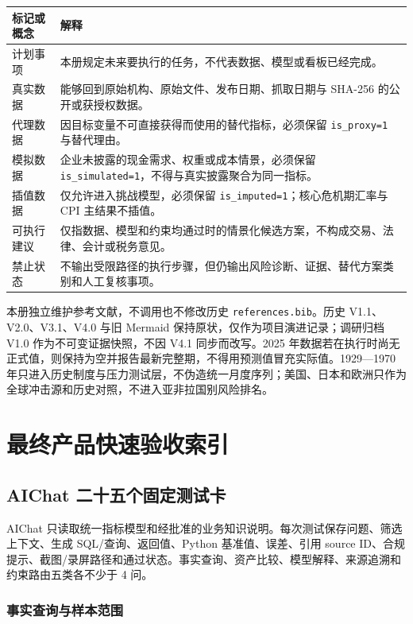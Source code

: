 \documentclass[UTF8,fontset=windows,12pt,openany]{ctexbook}
\newcommand{\Field}[1]{{\small\nolinkurl{#1}}}
\newcommand{\File}[1]{{\small\begingroup\urlstyle{same}\nolinkurl{#1}\endgroup}}
\begin{document}
\begin{longtable}{p{3.0cm}p{10.5cm}}
\toprule
\textbf{标记或概念} & \textbf{解释}\\
\midrule
计划事项 & 本册规定未来要执行的任务，不代表数据、模型或看板已经完成。\\
真实数据 & 能够回到原始机构、原始文件、发布日期、抓取日期与 SHA-256 的公开或获授权数据。\\
代理数据 & 因目标变量不可直接获得而使用的替代指标，必须保留 \Field{is_proxy=1} 与替代理由。\\
模拟数据 & 企业未披露的现金需求、权重或成本情景，必须保留 \Field{is_simulated=1}，不得与真实披露聚合为同一指标。\\
插值数据 & 仅允许进入挑战模型，必须保留 \Field{is_imputed=1}；核心危机期汇率与 CPI 主结果不插值。\\
可执行建议 & 仅指数据、模型和约束均通过时的情景化候选方案，不构成交易、法律、会计或税务意见。\\
禁止状态 & 不输出受限路径的执行步骤，但仍输出风险诊断、证据、替代方案类别和人工复核事项。\\
\bottomrule
\end{longtable}

本册独立维护参考文献，不调用也不修改历史 \File{references.bib}。历史 V1.1、V2.0、V3.1、V4.0 与旧 Mermaid 保持原状，仅作为项目演进记录；调研归档 V1.0 作为不可变证据快照，不因 V4.1 同步而改写。2025 年数据若在执行时尚无正式值，则保持为空并报告最新完整期，不得用预测值冒充实际值。1929—1970 年只进入历史制度与压力测试层，不伪造统一月度序列；美国、日本和欧洲只作为全球冲击源和历史对照，不进入亚非拉国别风险排名。

\tableofcontents
\listoftables

\mainmatter


\part{最终产品快速验收索引}

\chapter{AIChat 二十五个固定测试卡}

AIChat 只读取统一指标模型和经批准的业务知识说明。每次测试保存问题、筛选上下文、生成 SQL/查询、返回值、Python 基准值、误差、引用 source ID、合规提示、截图/录屏路径和通过状态。事实查询、资产比较、模型解释、来源追溯和约束路由五类各不少于 4 问。

\section{事实查询与样本范围}
\end{document}
